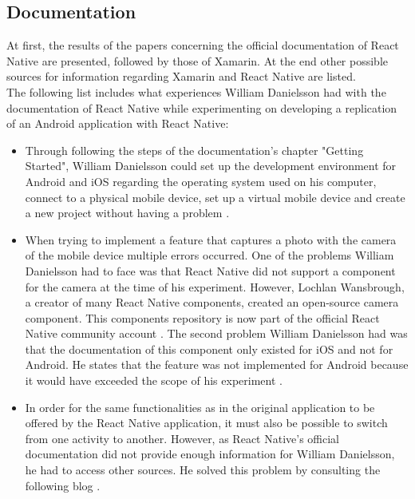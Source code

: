 \documentclass[Bachelor,BIF,english]{twbook}
\begin{document}
\subsection{Documentation}
At first, the results of the papers concerning the official documentation of React Native are presented, followed by those of Xamarin. At the end other possible sources for information regarding Xamarin and React Native are listed. 
\\[\baselineskip]
The following list includes what experiences William Danielsson had with the documentation of React Native \cite{ReactNativeDoc} while experimenting on developing a replication of an Android application with React Native: 
\begin{itemize}
\item Through following the steps of the documentation's chapter "Getting Started", William Danielsson could set up the development environment for Android and iOS regarding the operating system used on his computer, connect to a physical mobile device, set up a virtual mobile device and create a new project without having a problem \cite[p.~18]{Danielsson_2016}.
\item When trying to implement a feature that captures a photo with the camera of the mobile device multiple errors occurred. One of the problems William Danielsson had to face was that React Native did not support a component for the camera at the time of his experiment. However, Lochlan Wansbrough, a creator of many React Native components, created an open-source camera component. This components repository \cite{ReactNativeCamera} is now part of the official React Native community account \cite{ReactNativeCommunity}. The second problem William Danielsson had was that the documentation of this component only existed for iOS and not for Android. He states that the feature was not implemented for Android because it would have exceeded the scope of his experiment \cite[p.~23-24]{Danielsson_2016}.
\item In order for the same functionalities as in the original application to be offered by the React Native application, it must also be possible to switch from one activity to another. However, as React Native's official documentation did not provide enough information for William Danielsson, he had to access other sources. He solved this problem by consulting the following blog \cite{ReactNativeBlog} \cite[p.~51]{Danielsson_2016}.
\end{itemize}
\end{document}

